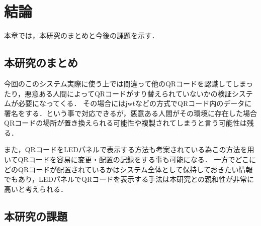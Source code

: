 \chapter{結論}
\label{conclusion}

本章では，本研究のまとめと今後の課題を示す．

\section{本研究のまとめ}

今回のこのシステム実際に使う上では間違って他のQRコードを認識してしまったり，悪意ある人間によってQRコードがすり替えられていないかの検証システムが必要になってくる．
その場合にはjwtなどの方式でQRコード内のデータに署名をする．という事で対応できるが，悪意ある人間がその環境に存在した場合QRコードの場所が置き換えられる可能性や複製されてしまうと言う可能性は残る．

また，QRコードをLEDパネルで表示する方法\cite{led_qr}も考案されている為この方法を用いてQRコードを容易に変更・配置の記録をする事も可能になる．
一方でどこにどのQRコードが配置されているかはシステム全体として保持しておきたい情報でもあり，LEDパネルでQRコードを表示する手法は本研究との親和性が非常に高いと考えられる．



\section{本研究の課題}

